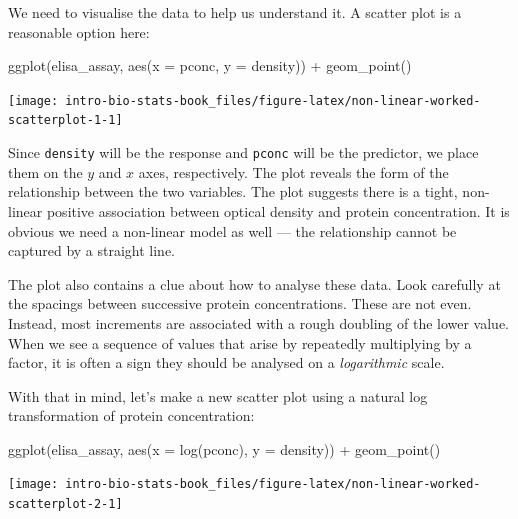 \documentclass[
]{book}
\newenvironment{Shaded}{\begin{snugshade}}{\end{snugshade}}
\newcommand{\AttributeTok}[1]{\textcolor[rgb]{0.77,0.63,0.00}{#1}}
\newcommand{\FunctionTok}[1]{\textcolor[rgb]{0.00,0.00,0.00}{#1}}
\newcommand{\NormalTok}[1]{#1}
\newcommand{\SpecialCharTok}[1]{\textcolor[rgb]{0.00,0.00,0.00}{#1}}
\begin{document}
We need to visualise the data to help us understand it. A scatter plot is a reasonable option here:

\begin{Shaded}
\begin{Highlighting}[]
\FunctionTok{ggplot}\NormalTok{(elisa\_assay, }\FunctionTok{aes}\NormalTok{(}\AttributeTok{x =}\NormalTok{ pconc, }\AttributeTok{y =}\NormalTok{ density)) }\SpecialCharTok{+} 
  \FunctionTok{geom\_point}\NormalTok{()}
\end{Highlighting}
\end{Shaded}

\begin{center}\texttt{[image: intro-bio-stats-book\_files/figure-latex/non-linear-worked-scatterplot-1-1]} \end{center}

Since \texttt{density} will be the response and \texttt{pconc} will be the predictor, we place them on the \(y\) and \(x\) axes, respectively. The plot reveals the form of the relationship between the two variables. The plot suggests there is a tight, non-linear positive association between optical density and protein concentration. It is obvious we need a non-linear model as well --- the relationship cannot be captured by a straight line.

The plot also contains a clue about how to analyse these data. Look carefully at the spacings between successive protein concentrations. These are not even. Instead, most increments are associated with a rough doubling of the lower value. When we see a sequence of values that arise by repeatedly multiplying by a factor, it is often a sign they should be analysed on a \emph{logarithmic} scale.

With that in mind, let's make a new scatter plot using a natural log transformation of protein concentration:

\begin{Shaded}
\begin{Highlighting}[]
\FunctionTok{ggplot}\NormalTok{(elisa\_assay, }\FunctionTok{aes}\NormalTok{(}\AttributeTok{x =} \FunctionTok{log}\NormalTok{(pconc), }\AttributeTok{y =}\NormalTok{ density)) }\SpecialCharTok{+} 
  \FunctionTok{geom\_point}\NormalTok{()}
\end{Highlighting}
\end{Shaded}

\begin{center}\texttt{[image: intro-bio-stats-book\_files/figure-latex/non-linear-worked-scatterplot-2-1]} \end{center}
\end{document}
